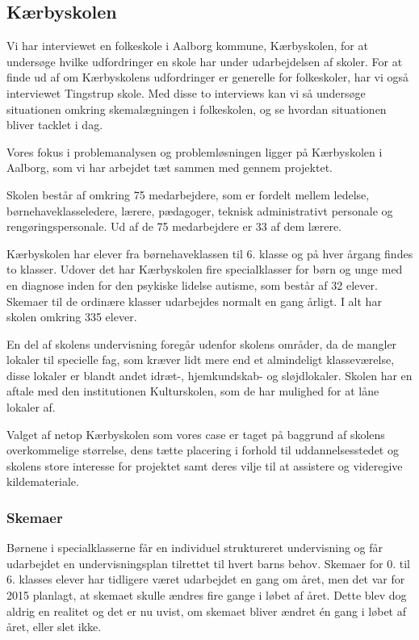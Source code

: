 \subsection{Kærbyskolen}
\label{Kaerbyskolen}
Vi har interviewet en folkeskole i Aalborg kommune, Kærbyskolen, for at undersøge hvilke udfordringer en skole har under udarbejdelsen af skoler. For at finde ud af om Kærbyskolens udfordringer er generelle for folkeskoler, har vi også interviewet Tingstrup skole. Med disse to interviews kan vi så undersøge situationen omkring skemalægningen i folkeskolen, og se hvordan situationen bliver tacklet i dag.

Vores fokus i problemanalysen og problemløsningen ligger på Kærbyskolen i Aalborg, som vi har arbejdet tæt sammen med gennem projektet.

Skolen består af omkring 75 medarbejdere, som er fordelt mellem ledelse, børnehaveklasseledere, lærere, pædagoger, teknisk administrativt personale og rengøringspersonale. Ud af de 75 medarbejdere er 33 af dem lærere.

Kærbyskolen har elever fra børnehaveklassen til 6. klasse og på hver årgang findes to klasser. Udover det har Kærbyskolen fire specialklasser for børn og unge med en diagnose inden for den psykiske lidelse autisme, som består af 32 elever. Skemaer til de ordinære klasser udarbejdes normalt en gang årligt. I alt har skolen omkring 335 elever.

En del af skolens undervisning foregår udenfor skolens områder, da de mangler lokaler til specielle fag, som kræver lidt mere end et almindeligt klasseværelse, disse lokaler er blandt andet idræt-, hjemkundskab- og sløjdlokaler. Skolen har en aftale med den institutionen Kulturskolen, som de har mulighed for at låne lokaler af.

Valget af netop Kærbyskolen som vores case er taget på baggrund af skolens overkommelige størrelse, dens tætte placering i forhold til uddannelsesstedet og skolens store interesse for projektet samt deres vilje til at assistere og videregive kildemateriale.

\subsubsection{Skemaer}
\label{Skemaer}
Børnene i specialklasserne får en individuel struktureret undervisning og får udarbejdet en undervisningsplan tilrettet til hvert barns behov\cite{j_klasser}.
Skemaer for 0. til 6. klasses elever har tidligere været udarbejdet en gang om året, men det var for 2015 planlagt, at skemaet skulle ændres fire gange i løbet af året. Dette blev dog aldrig en realitet og det er nu uvist, om skemaet bliver ændret \'en gang i løbet af året, eller slet ikke.

